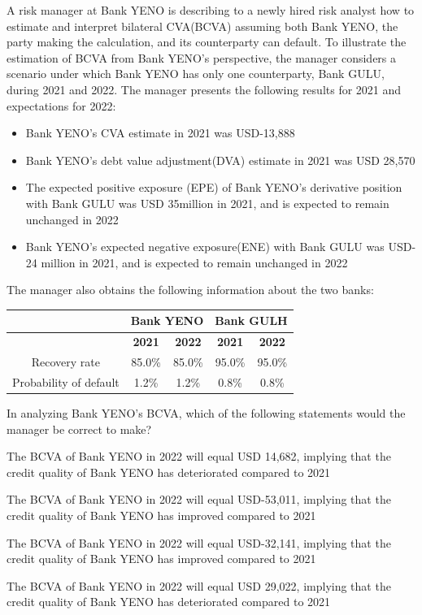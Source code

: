 \documentclass{article}
\newcounter{question} %
\begin{document}
\begin{question}
    A risk manager at Bank YENO is describing to a newly hired risk analyst how to estimate and interpret bilateral CVA(BCVA) assuming both Bank YENO, the party making the calculation, and its counterparty can default. To illustrate the estimation of BCVA from Bank YENO's perspective, the manager considers a scenario under which Bank YENO has only one counterparty, Bank GULU, during 2021 and 2022. The manager presents the following results for 2021 and expectations for 2022:
    \begin{itemize}
        \item Bank YENO's CVA estimate in 2021 was USD-13,888
        \item Bank YENO's debt value adjustment(DVA) estimate in 2021 was USD 28,570
        \item The expected positive exposure (EPE) of Bank YENO's derivative position with Bank GULU was USD 35million in 2021, and is expected to remain unchanged in 2022
        \item Bank YENO's expected negative exposure(ENE) with Bank GULU was USD-24 million in 2021, and is expected to remain unchanged in 2022
    \end{itemize}

    The manager also obtains the following information about the two banks:
    \begin{table}[H]
        \centering
        \renewcommand{\arraystretch}{1.2}
        \begin{tabular}{|c|c|c|c|c|}
            \hline
            & \multicolumn{2}{c|}{\textbf{Bank YENO}} & \multicolumn{2}{c|}{\textbf{Bank GULH}} \\
            \hline
            & \textbf{2021} & \textbf{2022} & \textbf{2021} & \textbf{2022} \\
            \hline
            Recovery rate & 85.0\% & 85.0\% & 95.0\% & 95.0\% \\
            \hline
            Probability of default & 1.2\% & 1.2\% & 0.8\% & 0.8\% \\
            \hline
        \end{tabular}
    \end{table}

    In analyzing Bank YENO's BCVA, which of the following statements would the manager be correct to make?
\end{question}

\begin{choices}
    \item The BCVA of Bank YENO in 2022 will equal USD 14,682, implying that the credit quality of Bank YENO has deteriorated compared to 2021
    \item The BCVA of Bank YENO in 2022 will equal USD-53,011, implying that the credit quality of Bank YENO has improved compared to 2021
    \item The BCVA of Bank YENO in 2022 will equal USD-32,141, implying that the credit quality of Bank YENO has improved compared to 2021
    \item The BCVA of Bank YENO in 2022 will equal USD 29,022, implying that the credit quality of Bank YENO has deteriorated compared to 2021
\end{choices}
\end{document}
